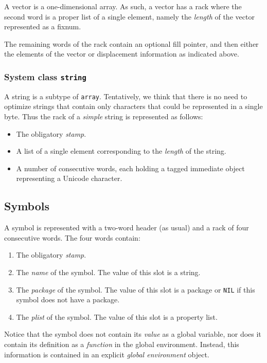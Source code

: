 A vector is a one-dimensional array.  As such, a vector has a rack
where the second word is a proper list of a single element,
namely the \emph{length} of the vector represented as a fixnum. 

The remaining words of the rack contain an optional fill
pointer, and then either the elements of the vector or displacement
information as indicated above. 

\subsubsection{System class \texttt{string}}

A string is a subtype of \texttt{array}.  Tentatively, we think that
there is no need to optimize strings that contain only characters that
could be represented in a single byte.  Thus the rack of a
\emph{simple} string is represented as follows:

\begin{itemize}
\item The obligatory \emph{stamp}.
\item A list of a single element corresponding to the \emph{length} of
  the string. 
\item A number of consecutive words, each holding a tagged immediate
  object representing a Unicode character.
\end{itemize}

\subsection{Symbols}

A symbol is represented with a two-word header (as usual) and a
rack of four consecutive words.  The four words contain:

\begin{enumerate}
\item The obligatory \emph{stamp}.
\item The \emph{name} of the symbol.  The value of this slot is a
  string.
\item The \emph{package} of the symbol.  The value of this slot is a
  package or \texttt{NIL} if this symbol does not have a package.
\item The \emph{plist} of the symbol.  The value of this slot is a
  property list.
\end{enumerate}

Notice that the symbol does not contain its \emph{value} as a global
variable, nor does it contain its definition as a \emph{function} in
the global environment.  Instead, this information is contained in an
explicit \emph{global environment} object.

